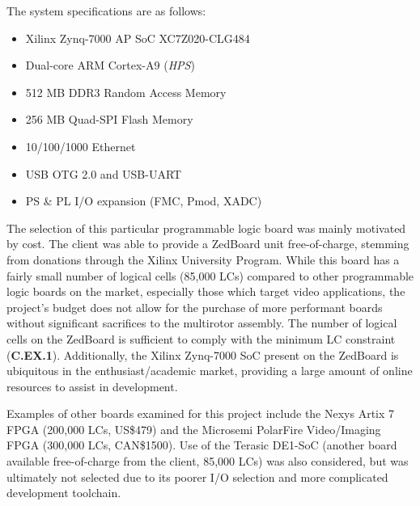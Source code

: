 The system specifications are as follows\cite{zedboard}:
\begin{itemize}
\item Xilinx Zynq-7000 AP SoC XC7Z020-CLG484
\item Dual-core ARM Cortex-A9 (\textit{HPS})
\item 512 MB DDR3 Random Access Memory
\item 256 MB Quad-SPI Flash Memory
\item 10/100/1000 Ethernet 
\item USB OTG 2.0 and USB-UART 
\item PS \& PL I/O expansion (FMC, Pmod, XADC)
\end{itemize}

The selection of this particular programmable logic board was mainly motivated by cost. The client was able to provide a ZedBoard unit free-of-charge, stemming from donations through the Xilinx University Program. While this board has a fairly small number of logical cells (85,000 LCs) compared to other programmable logic boards on the market, especially those which target video applications, the project's budget does not allow for the purchase of more performant boards without significant sacrifices to the multirotor assembly. The number of logical cells on the ZedBoard is sufficient to comply with the minimum LC constraint (\textbf{C.EX.1}). Additionally, the Xilinx Zynq-7000 SoC present on the ZedBoard is ubiquitous in the enthusiast/academic market, providing a large amount of online resources to assist in development.

Examples of other boards examined for this project include the Nexys Artix 7 FPGA (200,000 LCs, US\$479)\cite{nexys} and the Microsemi PolarFire Video/Imaging FPGA (300,000 LCs, CAN\$1500)\cite{microsemi}. Use of the Terasic DE1-SoC (another board available free-of-charge from the client, 85,000 LCs) was also considered, but was ultimately not selected due to its poorer I/O selection and more complicated development toolchain.

